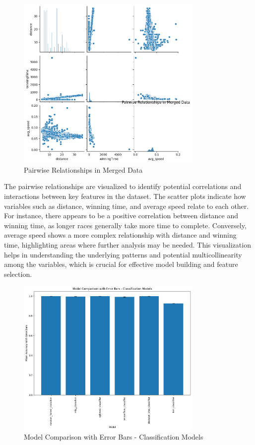 \documentclass{article}
\begin{document}
\begin{figure}[H]
    \centering
    \includegraphics[width=0.8\textwidth]{images/pairwise_relationships.png} %
    \caption{Pairwise Relationships in Merged Data}
    \label{fig:pairwise_relationships}
\end{figure}

The pairwise relationships are visualized to identify potential correlations and interactions between key features in the dataset. The scatter plots indicate how variables such as distance, winning time, and average speed relate to each other. For instance, there appears to be a positive correlation between distance and winning time, as longer races generally take more time to complete. Conversely, average speed shows a more complex relationship with distance and winning time, highlighting areas where further analysis may be needed. This visualization helps in understanding the underlying patterns and potential multicollinearity among the variables, which is crucial for effective model building and feature selection.

\begin{figure}[H]
    \centering
    \includegraphics[width=0.8\textwidth]{images/classification_models.png} %
    \caption{Model Comparison with Error Bars - Classification Models}
    \label{fig:classification_models}
\end{figure}
\end{document}
